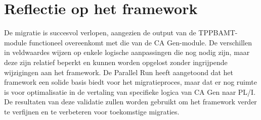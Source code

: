 \section{Reflectie op het framework}
\label{sec:val-reflectie-framework}

De migratie is succesvol verlopen, aangezien de output van de TPPBAMT-module functioneel overeenkomt met die van de CA Gen-module. De verschillen in veldwaardes wijzen op enkele logische aanpassingen die nog nodig zijn, maar deze zijn relatief beperkt en kunnen worden opgelost zonder ingrijpende wijzigingen aan het framework. De Parallel Run heeft aangetoond dat het framework een solide basis biedt voor het migratieproces, maar dat er nog ruimte is voor optimalisatie in de vertaling van specifieke logica van CA Gen naar PL/I. De resultaten van deze validatie zullen worden gebruikt om het framework verder te verfijnen en te verbeteren voor toekomstige migraties.